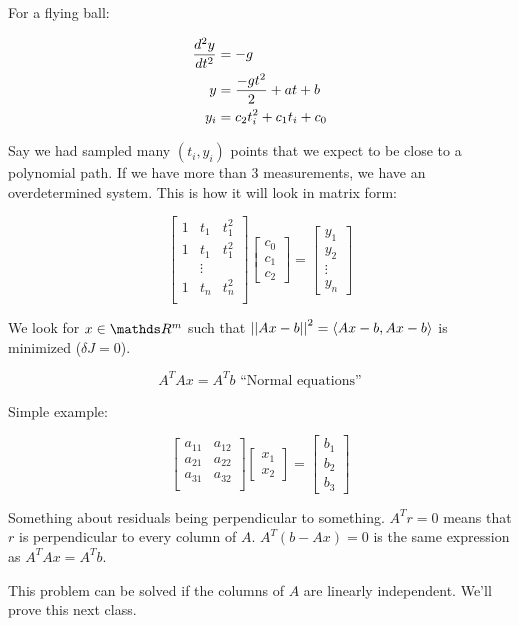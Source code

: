 For a flying ball:

\begin{align*}
  {d^2 y \over d t^2} &= -g\\
  y &= {-gt^2 \over 2} + at + b\\
  y_i &= c_2 t_i^2 + c_1 t_i + c_0
\end{align*}

Say we had sampled many $(t_i,y_i)$ points that we expect to be close to a polynomial path. If we have more than 3 measurements, we have an overdetermined system. This is how it will look in matrix form:

\[
  \begin{bmatrix}
    1 & t_1 & t_1^2 \\
    1 & t_1 & t_1^2 \\
     & \vdots &     \\
    1 & t_n & t_n^2 \\
  \end{bmatrix}
  \begin{bmatrix}
    c_0 \\ c_1 \\ c_2
  \end{bmatrix}
  =
  \begin{bmatrix}
    y_1 \\ y_2 \\ \vdots \\ y_n
  \end{bmatrix}
\]

We look for $x \in \bbR^m$ such that $\left|\left|Ax-b\right|\right|^2 = \langle Ax-b,Ax-b\rangle$ is minimized ($\delta J = 0$).

\[
  A^T Ax = A^T b \text{ ``Normal equations''}
\]

Simple example:

\[
  \begin{bmatrix}
    a_{11} & a_{12} \\ 
    a_{21} & a_{22} \\ 
    a_{31} & a_{32} \\ 
  \end{bmatrix}
  \begin{bmatrix}
    x_1 \\ x_2
  \end{bmatrix}
  =
  \begin{bmatrix}
    b_1 \\ b_2 \\ b_3
  \end{bmatrix}
\]

Something about residuals being perpendicular to something. $A^T r = 0$ means that $r$ is perpendicular to every column of $A$. $A^T(b-Ax) = 0$ is the same expression as $A^TAx = A^T b$.

This problem can be solved if the columns of $A$ are linearly independent. We'll prove this next class.